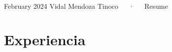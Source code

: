 \documentclass[11pt,a4paper,]{awesome-cv}
\begin{document}
\makecvheader

\makecvfooter
  {February 2024}
    { Vidal Mendoza Tinoco~~~·~~~Resume}
  {\thepage}





\hypertarget{experiencia}{%
\section{Experiencia}\label{experiencia}}
\end{document}
